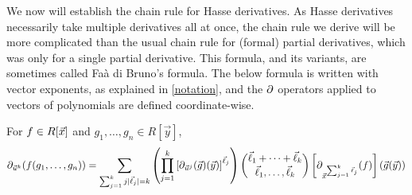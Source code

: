 \documentclass[letterpaper,11pt]{article}
\numberwithin{equation}{section}
\theoremstyle{plain}
\theoremstyle{remark}
\begin{document}
We now will establish the chain rule for Hasse derivatives.  As Hasse derivatives necessarily take multiple derivatives all at once, the chain rule we derive will be more complicated than the usual chain rule for (formal) partial derivatives, which was only for a single partial derivative.  This formula, and its variants, are sometimes called Fa\`{a} di Bruno's formula. The below formula is written with vector exponents, as explained in \autoref{notation}, and the $\partial$ operators applied to vectors of polynomials are defined coordinate-wise.

\begin{lemma}
	\label{hassechainrule}
	For $f\in R[\vec{x}]$ and $g_1,\ldots,g_n\in R[\vec{y}]$,
	\begin{multline*}
		\partial_{\vec{u}^k}(f(g_1,\ldots,g_n))
		=\sum_{\sum_{j=1}^k j|\vec{\ell}_j|=k}
			\left(\prod_{j=1}^{k}\left[\partial_{\vec{u}^j}(\vec{g})(\vec{y})\right]^{\vec{\ell}_{j}}\right)
			\binom{\vec{\ell}_{1}+\cdots+\vec{\ell}_{k}}{\vec{\ell}_{1},\ldots,\vec{\ell}_{k}}\left[\partial_{\vec{x}^{\sum_{j=1}^k\vec{\ell}_j}}(f)\right](\vec{g}(\vec{y}))
	\end{multline*}
\end{lemma}
\end{document}
